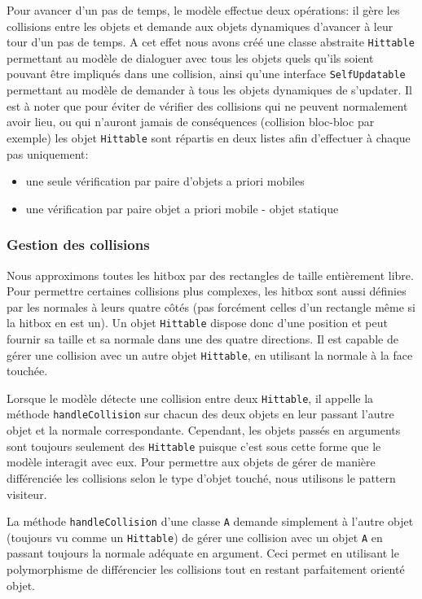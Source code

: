 \documentclass[a4paper, 12pt]{article}
\begin{document}
Pour avancer d'un pas de temps, le modèle effectue deux opérations: il gère les collisions entre les objets et demande aux objets dynamiques d'avancer à leur tour d'un pas de temps. A cet effet nous avons créé une classe abstraite {\tt Hittable} permettant au modèle de dialoguer avec tous les objets quels qu'ils soient pouvant être impliqués dans une collision, ainsi qu'une interface {\tt SelfUpdatable} permettant au modèle de demander à tous les objets dynamiques de s'updater. Il est à noter que pour éviter de vérifier des collisions qui ne peuvent normalement avoir lieu, ou qui n'auront jamais de conséquences (collision bloc-bloc par exemple) les objet {\tt Hittable} sont répartis en deux listes afin d'effectuer à chaque pas uniquement:
\begin{itemize}
  \item une seule vérification par paire d'objets a priori mobiles
  \item une vérification par paire objet a priori mobile - objet statique
\end{itemize}

\subsubsection{Gestion des collisions}

Nous approximons toutes les hitbox par des rectangles de taille entièrement libre. Pour permettre certaines collisions plus complexes, les hitbox sont aussi définies par les normales à leurs quatre côtés (pas forcément celles d'un rectangle même si la hitbox en est un). Un objet {\tt Hittable} dispose donc d'une position et peut fournir sa taille et sa normale dans une des quatre directions. Il est capable de gérer une collision avec un autre objet {\tt Hittable}, en utilisant la normale à la face touchée.

Lorsque le modèle détecte une collision entre deux {\tt Hittable}, il appelle la méthode {\tt handleCollision} sur chacun des deux objets en leur passant l'autre objet et la normale correspondante. Cependant, les objets passés en arguments sont toujours seulement des {\tt Hittable} puisque c'est sous cette forme que le modèle interagit avec eux. Pour permettre aux objets de gérer de manière différenciée les collisions selon le type d'objet touché, nous utilisons le pattern visiteur.

La méthode {\tt handleCollision} d'une classe {\tt A} demande simplement à l'autre objet (toujours vu comme un {\tt Hittable}) de gérer une collision avec un objet {\tt A} en passant toujours la normale adéquate en argument. Ceci permet en utilisant le polymorphisme de différencier les collisions tout en restant parfaitement orienté objet.
\end{document}
